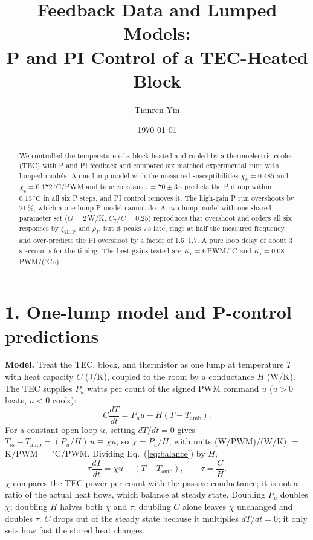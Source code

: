 \documentclass[reprint, amsmath, amssymb, aps, floatfix]{revtex4-2}
\newcommand{\degC}{\,^\circ\mathrm{C}}
\newcommand{\Tamb}{T_{\mathrm{amb}}}
\newcommand{\zP}{\zeta_{\mathrm{2L,P}}}
\begin{document}

\title{Feedback Data and Lumped Models:\\ P and PI Control of a TEC-Heated Block}

\author{Tianren Yin}

\date{\today}

\begin{abstract}
We controlled the temperature of a block heated and cooled by a thermoelectric cooler (TEC)
with P and PI feedback and compared six matched experimental runs with lumped models. A
one-lump model with the measured susceptibilities $\chi_h = 0.485$ and
$\chi_c = 0.172\degC$/PWM and time constant $\tau = 70 \pm 3$\,s predicts the P droop within
$0.13\degC$ in all six P steps, and PI control removes it. The high-gain P run overshoots
by 21\,\%, which a one-lump P model cannot do. A two-lump model with one shared parameter set
($G = 2$\,W/K, $C_T/C = 0.25$) reproduces that overshoot and orders all six responses by
$\zP$ and $\rho_I$, but it peaks 7\,s late, rings at half the measured frequency, and
over-predicts the PI overshoot by a factor of 1.5--1.7. A pure loop delay of about 3\,s
accounts for the timing. The best gains tested are $K_p = 6$\,PWM/$^\circ$C and
$K_i = 0.08$\,PWM/($^\circ$C\,s).
\end{abstract}

\maketitle

\section*{1. One-lump model and P-control predictions}

\textbf{Model.} Treat the TEC, block, and thermistor as one lump at temperature $T$ with
heat capacity $C$ (J/K), coupled to the room by a conductance $H$ (W/K). The TEC supplies
$P_u$ watts per count of the signed PWM command $u$ ($u > 0$ heats, $u < 0$ cools):
\begin{equation}
C\frac{dT}{dt} = P_u u - H(T - \Tamb).
\label{eq:balance}
\end{equation}
For a constant open-loop $u$, setting $dT/dt = 0$ gives
$T_{\mathrm{ss}} - \Tamb = (P_u/H)\,u \equiv \chi u$, so $\chi = P_u/H$, with units
(W/PWM)/(W/K) $=$ K/PWM $= {}^\circ$C/PWM. Dividing Eq.~(\ref{eq:balance}) by $H$,
\begin{equation}
\tau\frac{dT}{dt} = \chi u - (T - \Tamb), \qquad \tau = \frac{C}{H}.
\label{eq:onelump}
\end{equation}
$\chi$ compares the TEC power per count with the passive conductance; it is not a ratio of
the actual heat flows, which balance at steady state. Doubling $P_u$ doubles $\chi$;
doubling $H$ halves both $\chi$ and $\tau$; doubling $C$ alone leaves $\chi$ unchanged and
doubles $\tau$. $C$ drops out of the steady state because it multiplies $dT/dt = 0$; it only
sets how fast the stored heat changes.
\end{document}
